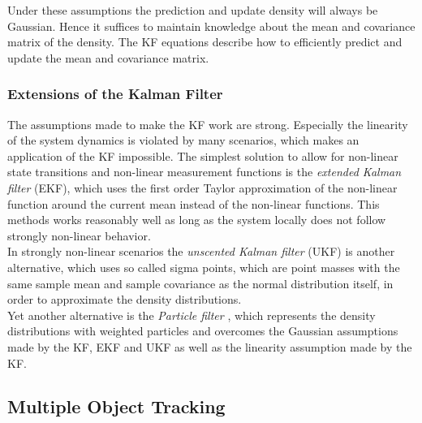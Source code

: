 \documentclass[12pt,a4paper]{article}
\begin{document}
Under these assumptions the prediction and update density will always be Gaussian. Hence it suffices to maintain knowledge about the mean and covariance matrix of the density. The KF equations describe how to efficiently predict and update the mean and covariance matrix. %

\subsubsection{Extensions of the Kalman Filter}

 \begin{sloppypar}
The assumptions made to make the KF work are strong. Especially the linearity of the system dynamics is violated by many scenarios, which makes an application of the KF impossible. The simplest solution to allow for non-linear state transitions and non-linear measurement functions is the \emph{extended Kalman filter} (EKF),
 which uses the first order Taylor approximation of the non-linear function around the current mean instead of the non-linear functions. This methods works reasonably well as long as the system locally does not follow strongly non-linear behavior. \\
 In strongly non-linear scenarios the \emph{unscented Kalman filter} (UKF) \cite{UKF}
 is another alternative, which uses so called sigma points, which are point masses with the same sample mean and sample covariance as the normal distribution itself, in order to approximate the density distributions.\\
 Yet another alternative is the \emph{Particle filter} \cite{particle_filter}, which represents the density distributions with weighted particles and overcomes the Gaussian assumptions made by the KF, EKF and UKF as well as the linearity assumption made by the KF.
\end{sloppypar}


\subsection{Multiple Object Tracking}
\end{document}
